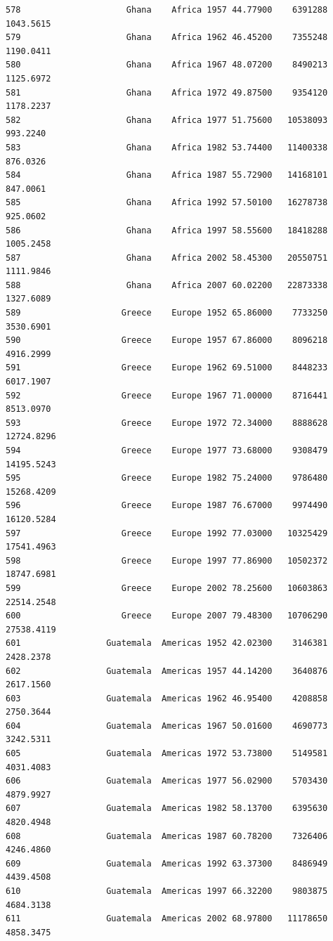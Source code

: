 \documentclass[
  letterpaper,
  DIV=11,
  numbers=noendperiod]{scrreprt}
\begin{document}
\begin{verbatim}
578                     Ghana    Africa 1957 44.77900    6391288   1043.5615
579                     Ghana    Africa 1962 46.45200    7355248   1190.0411
580                     Ghana    Africa 1967 48.07200    8490213   1125.6972
581                     Ghana    Africa 1972 49.87500    9354120   1178.2237
582                     Ghana    Africa 1977 51.75600   10538093    993.2240
583                     Ghana    Africa 1982 53.74400   11400338    876.0326
584                     Ghana    Africa 1987 55.72900   14168101    847.0061
585                     Ghana    Africa 1992 57.50100   16278738    925.0602
586                     Ghana    Africa 1997 58.55600   18418288   1005.2458
587                     Ghana    Africa 2002 58.45300   20550751   1111.9846
588                     Ghana    Africa 2007 60.02200   22873338   1327.6089
589                    Greece    Europe 1952 65.86000    7733250   3530.6901
590                    Greece    Europe 1957 67.86000    8096218   4916.2999
591                    Greece    Europe 1962 69.51000    8448233   6017.1907
592                    Greece    Europe 1967 71.00000    8716441   8513.0970
593                    Greece    Europe 1972 72.34000    8888628  12724.8296
594                    Greece    Europe 1977 73.68000    9308479  14195.5243
595                    Greece    Europe 1982 75.24000    9786480  15268.4209
596                    Greece    Europe 1987 76.67000    9974490  16120.5284
597                    Greece    Europe 1992 77.03000   10325429  17541.4963
598                    Greece    Europe 1997 77.86900   10502372  18747.6981
599                    Greece    Europe 2002 78.25600   10603863  22514.2548
600                    Greece    Europe 2007 79.48300   10706290  27538.4119
601                 Guatemala  Americas 1952 42.02300    3146381   2428.2378
602                 Guatemala  Americas 1957 44.14200    3640876   2617.1560
603                 Guatemala  Americas 1962 46.95400    4208858   2750.3644
604                 Guatemala  Americas 1967 50.01600    4690773   3242.5311
605                 Guatemala  Americas 1972 53.73800    5149581   4031.4083
606                 Guatemala  Americas 1977 56.02900    5703430   4879.9927
607                 Guatemala  Americas 1982 58.13700    6395630   4820.4948
608                 Guatemala  Americas 1987 60.78200    7326406   4246.4860
609                 Guatemala  Americas 1992 63.37300    8486949   4439.4508
610                 Guatemala  Americas 1997 66.32200    9803875   4684.3138
611                 Guatemala  Americas 2002 68.97800   11178650   4858.3475

\end{verbatim}
\end{document}
